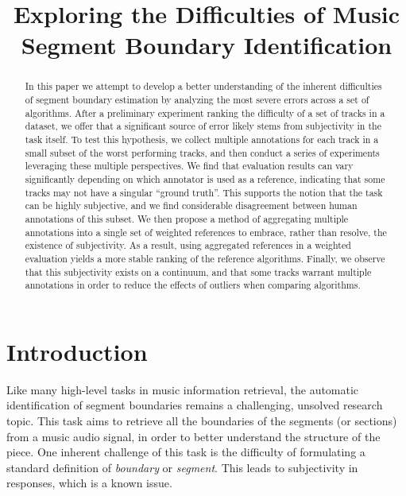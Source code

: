 \documentclass{article}
\title{Exploring the Difficulties of Music Segment Boundary Identification}
\begin{document}
%
\maketitle
%
\begin{abstract}
In this paper we attempt to develop a better understanding of the inherent difficulties of segment boundary estimation by analyzing the most severe errors across a set of algorithms.
After a preliminary experiment ranking the difficulty of a set of tracks in a dataset, we offer that a significant source of error likely stems from subjectivity in the task itself.
To test this hypothesis, we collect multiple annotations for each track in a small subset of the worst performing tracks, and then conduct a series of experiments leveraging these multiple perspectives.
We find that evaluation results can vary significantly depending on which annotator is used as a reference, indicating that some tracks may not have a singular ``ground truth''.
This supports the notion that the task can be highly subjective, and we find considerable disagreement between human annotations of this subset.
We then propose a method of aggregating multiple annotations into a single set of weighted references to embrace, rather than resolve, the existence of subjectivity.
As a result, using  aggregated references in a weighted evaluation yields a more stable ranking of the reference algorithms. 
Finally, we observe that this subjectivity exists on a continuum, and that some tracks warrant multiple annotations in order to reduce the effects of outliers when comparing algorithms.

  
\end{abstract}
%
\section{Introduction}\label{sec:introduction}

Like many high-level tasks in music information retrieval, the automatic identification of segment boundaries remains a challenging, unsolved research topic. 
This task aims to retrieve all the boundaries of the segments (or sections) from a music audio signal, in order to better understand the structure of the piece.
One inherent challenge of this task is the difficulty of formulating a standard definition of \emph{boundary} or \emph{segment}.
This leads to subjectivity in responses, which is a known issue.
\end{document}
